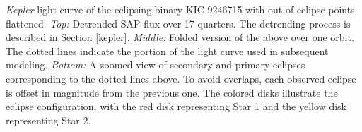 \label{fig:keplerfig} \emph{Kepler} light curve of the eclipsing binary KIC 9246715 with out-of-eclipse points flattened. \emph{Top:} Detrended SAP flux over 17 quarters. The detrending process is described in Section \ref{kepler}. \emph{Middle:} Folded version of the above over one orbit. The dotted lines indicate the portion of the light curve used in subsequent modeling. \emph{Bottom:} A zoomed view of secondary and primary eclipses corresponding to the dotted lines above. To avoid overlaps, each observed eclipse is offset in magnitude from the previous one. The colored disks illustrate the eclipse configuration, with the red disk representing Star 1 and the yellow disk representing Star 2.
